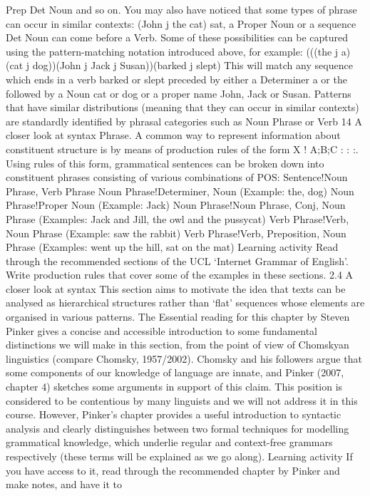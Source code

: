 Prep Det Noun and so on. You may also have noticed that some types of phrase can
occur in similar contexts: (John j the cat) sat, a Proper Noun or a sequence Det Noun
can come before a Verb. Some of these possibilities can be captured using the
pattern-matching notation introduced above, for example:
(((the j a)(cat j dog))(John j Jack j Susan))(barked j slept)
This will match any sequence which ends in a verb barked or slept preceded by
either a Determiner a or the followed by a Noun cat or dog or a proper name John,
Jack or Susan.
Patterns that have similar distributions (meaning that they can occur in similar
contexts) are standardly identified by phrasal categories such as Noun Phrase or Verb
14
A closer look at syntax
Phrase. A common way to represent information about constituent structure is by
means of production rules of the form X ! A;B;C : : :. Using rules of this form,
grammatical sentences can be broken down into constituent phrases consisting of
various combinations of POS:
Sentence!Noun Phrase, Verb Phrase
Noun Phrase!Determiner, Noun (Example: the, dog)
Noun Phrase!Proper Noun (Example: Jack)
Noun Phrase!Noun Phrase, Conj, Noun Phrase (Examples: Jack and Jill, the owl and the pussycat)
Verb Phrase!Verb, Noun Phrase (Example: saw the rabbit)
Verb Phrase!Verb, Preposition, Noun Phrase (Examples: went up the hill, sat on the mat)
Learning activity
Read through the recommended sections of the UCL ‘Internet Grammar of English’. Write production rules
that cover some of the examples in these sections.
2.4 A closer look at syntax
This section aims to motivate the idea that texts can be analysed as hierarchical
structures rather than ‘flat’ sequences whose elements are organised in various
patterns. The Essential reading for this chapter by Steven Pinker gives a concise and
accessible introduction to some fundamental distinctions we will make in this
section, from the point of view of Chomskyan linguistics (compare Chomsky,
1957/2002). Chomsky and his followers argue that some components of our
knowledge of language are innate, and Pinker (2007, chapter 4) sketches some
arguments in support of this claim. This position is considered to be contentious by
many linguists and we will not address it in this course. However, Pinker’s chapter
provides a useful introduction to syntactic analysis and clearly distinguishes between
two formal techniques for modelling grammatical knowledge, which underlie
regular and context-free grammars respectively (these terms will be explained as
we go along).
Learning activity
If you have access to it, read through the recommended chapter by Pinker and make notes, and have it to
